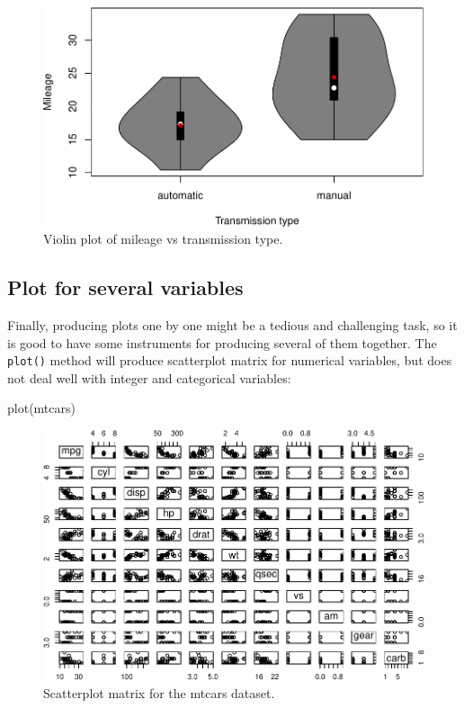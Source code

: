 \documentclass[
]{book}
\newenvironment{Shaded}{\begin{snugshade}}{\end{snugshade}}
\newcommand{\FunctionTok}[1]{\textcolor[rgb]{0.00,0.00,0.00}{#1}}
\newcommand{\NormalTok}[1]{#1}
\theoremstyle{definition}
\theoremstyle{definition}
\theoremstyle{definition}
\theoremstyle{definition}
\theoremstyle{remark}
\begin{document}
\begin{figure}
\centering
\includegraphics{Svetunkov---Statistics-for-Business-Analytics_files/figure-latex/vioAMMPG-1.pdf}
\caption{\label{fig:vioAMMPG}Violin plot of mileage vs transmission type.}
\end{figure}

\hypertarget{plot-for-several-variables}{%
\subsection{Plot for several variables}\label{plot-for-several-variables}}

Finally, producing plots one by one might be a tedious and challenging task, so it is good to have some instruments for producing several of them together. The \texttt{plot()} method will produce scatterplot matrix for numerical variables, but does not deal well with integer and categorical variables:

\begin{Shaded}
\begin{Highlighting}[]
\FunctionTok{plot}\NormalTok{(mtcars)}
\end{Highlighting}
\end{Shaded}

\begin{figure}
\centering
\includegraphics{Svetunkov---Statistics-for-Business-Analytics_files/figure-latex/scatterMatrix-1.pdf}
\caption{\label{fig:scatterMatrix}Scatterplot matrix for the mtcars dataset.}
\end{figure}
\end{document}
